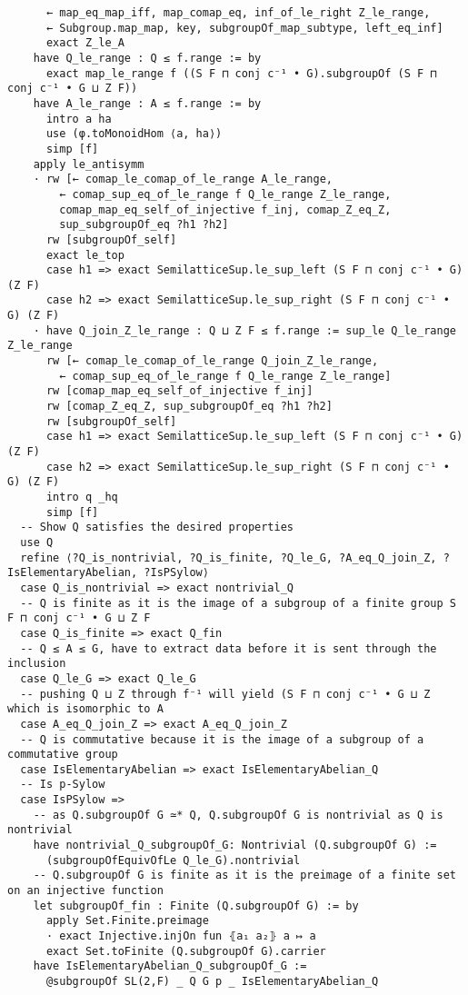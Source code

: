 \begin{tiny}
\begin{verbatim}
      ← map_eq_map_iff, map_comap_eq, inf_of_le_right Z_le_range,
      ← Subgroup.map_map, key, subgroupOf_map_subtype, left_eq_inf]
      exact Z_le_A
    have Q_le_range : Q ≤ f.range := by
      exact map_le_range f ((S F ⊓ conj c⁻¹ • G).subgroupOf (S F ⊓ conj c⁻¹ • G ⊔ Z F))
    have A_le_range : A ≤ f.range := by
      intro a ha
      use (φ.toMonoidHom ⟨a, ha⟩)
      simp [f]
    apply le_antisymm
    · rw [← comap_le_comap_of_le_range A_le_range,
        ← comap_sup_eq_of_le_range f Q_le_range Z_le_range,
        comap_map_eq_self_of_injective f_inj, comap_Z_eq_Z,
        sup_subgroupOf_eq ?h1 ?h2]
      rw [subgroupOf_self]
      exact le_top
      case h1 => exact SemilatticeSup.le_sup_left (S F ⊓ conj c⁻¹ • G) (Z F)
      case h2 => exact SemilatticeSup.le_sup_right (S F ⊓ conj c⁻¹ • G) (Z F)
    · have Q_join_Z_le_range : Q ⊔ Z F ≤ f.range := sup_le Q_le_range Z_le_range
      rw [← comap_le_comap_of_le_range Q_join_Z_le_range,
        ← comap_sup_eq_of_le_range f Q_le_range Z_le_range]
      rw [comap_map_eq_self_of_injective f_inj]
      rw [comap_Z_eq_Z, sup_subgroupOf_eq ?h1 ?h2]
      rw [subgroupOf_self]
      case h1 => exact SemilatticeSup.le_sup_left (S F ⊓ conj c⁻¹ • G) (Z F)
      case h2 => exact SemilatticeSup.le_sup_right (S F ⊓ conj c⁻¹ • G) (Z F)
      intro q _hq
      simp [f]
  -- Show Q satisfies the desired properties
  use Q
  refine ⟨?Q_is_nontrivial, ?Q_is_finite, ?Q_le_G, ?A_eq_Q_join_Z, ?IsElementaryAbelian, ?IsPSylow⟩
  case Q_is_nontrivial => exact nontrivial_Q
  -- Q is finite as it is the image of a subgroup of a finite group S F ⊓ conj c⁻¹ • G ⊔ Z F
  case Q_is_finite => exact Q_fin
  -- Q ≤ A ≤ G, have to extract data before it is sent through the inclusion
  case Q_le_G => exact Q_le_G
  -- pushing Q ⊔ Z through f⁻¹ will yield (S F ⊓ conj c⁻¹ • G ⊔ Z which is isomorphic to A
  case A_eq_Q_join_Z => exact A_eq_Q_join_Z
  -- Q is commutative because it is the image of a subgroup of a commutative group
  case IsElementaryAbelian => exact IsElementaryAbelian_Q
  -- Is p-Sylow
  case IsPSylow =>
    -- as Q.subgroupOf G ≃* Q, Q.subgroupOf G is nontrivial as Q is nontrivial
    have nontrivial_Q_subgroupOf_G: Nontrivial (Q.subgroupOf G) :=
      (subgroupOfEquivOfLe Q_le_G).nontrivial
    -- Q.subgroupOf G is finite as it is the preimage of a finite set on an injective function
    let subgroupOf_fin : Finite (Q.subgroupOf G) := by
      apply Set.Finite.preimage
      · exact Injective.injOn fun ⦃a₁ a₂⦄ a ↦ a
      exact Set.toFinite (Q.subgroupOf G).carrier
    have IsElementaryAbelian_Q_subgroupOf_G :=
      @subgroupOf SL(2,F) _ Q G p _ IsElementaryAbelian_Q

\end{verbatim}
\end{tiny}
